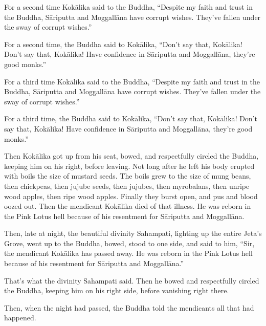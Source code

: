 \documentclass[12pt,openany]{book}%
\begin{document}
For a second time \textsanskrit{Kokālika} said to the Buddha, “Despite my faith and trust in the Buddha, \textsanskrit{Sāriputta} and \textsanskrit{Moggallāna} have corrupt wishes. They’ve fallen under the sway of corrupt wishes.” 

For a second time, the Buddha said to \textsanskrit{Kokālika}, “Don’t say that, \textsanskrit{Kokālika}! Don’t say that, \textsanskrit{Kokālika}! Have confidence in \textsanskrit{Sāriputta} and \textsanskrit{Moggallāna}, they’re good monks.” 

For a third time \textsanskrit{Kokālika} said to the Buddha, “Despite my faith and trust in the Buddha, \textsanskrit{Sāriputta} and \textsanskrit{Moggallāna} have corrupt wishes. They’ve fallen under the sway of corrupt wishes.” 

For a third time, the Buddha said to \textsanskrit{Kokālika}, “Don’t say that, \textsanskrit{Kokālika}! Don’t say that, \textsanskrit{Kokālika}! Have confidence in \textsanskrit{Sāriputta} and \textsanskrit{Moggallāna}, they’re good monks.” 

Then \textsanskrit{Kokālika} got up from his seat, bowed, and respectfully circled the Buddha, keeping him on his right, before leaving. Not long after he left his body erupted with boils the size of mustard seeds. The boils grew to the size of mung beans, then chickpeas, then jujube seeds, then jujubes, then myrobalans, then unripe wood apples, then ripe wood apples. Finally they burst open, and pus and blood oozed out. Then the mendicant \textsanskrit{Kokālika} died of that illness. He was reborn in the Pink Lotus hell because of his resentment for \textsanskrit{Sāriputta} and \textsanskrit{Moggallāna}. 

Then, late at night, the beautiful divinity Sahampati, lighting up the entire Jeta’s Grove, went up to the Buddha, bowed, stood to one side, and said to him, “Sir, the mendicant \textsanskrit{Kokālika} has passed away. He was reborn in the Pink Lotus hell because of his resentment for \textsanskrit{Sāriputta} and \textsanskrit{Moggallāna}.” 

That’s what the divinity Sahampati said. Then he bowed and respectfully circled the Buddha, keeping him on his right side, before vanishing right there. 

Then, when the night had passed, the Buddha told the mendicants all that had happened. 
\end{document}
